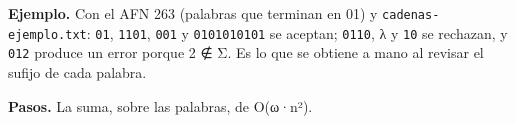 \begin{Shaded}
\begin{Highlighting}[]
\end{Highlighting}
\end{Shaded}

\textbf{Ejemplo.} Con el AFN 263 (palabras que terminan en 01) y \texttt{cadenas-ejemplo.txt}: \texttt{01}, \texttt{1101}, \texttt{001} y \texttt{0101010101} se aceptan; \texttt{0110}, λ y \texttt{10} se rechazan, y \texttt{012} produce un error porque 2 ∉ Σ. Es lo que se obtiene a mano al revisar el sufijo de cada palabra.

\textbf{Pasos.} La suma, sobre las palabras, de O(\textbar ω\textbar·n²).
